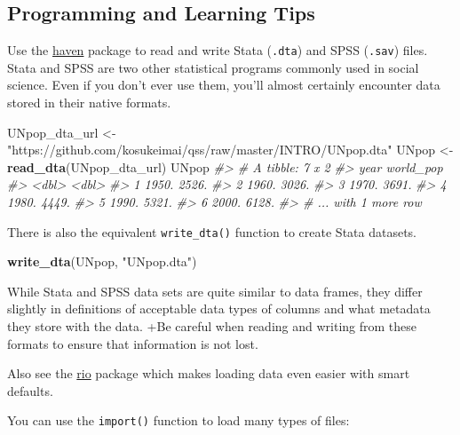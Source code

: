 \documentclass[]{book}
\newenvironment{Shaded}{\begin{snugshade}}{\end{snugshade}}
\newcommand{\CommentTok}[1]{\textcolor[rgb]{0.56,0.35,0.01}{\textit{#1}}}
\newcommand{\KeywordTok}[1]{\textcolor[rgb]{0.13,0.29,0.53}{\textbf{#1}}}
\newcommand{\NormalTok}[1]{#1}
\newcommand{\StringTok}[1]{\textcolor[rgb]{0.31,0.60,0.02}{#1}}
\theoremstyle{definition}
\theoremstyle{definition}
\theoremstyle{definition}
\theoremstyle{remark}
\begin{document}
\hypertarget{programming-and-learning-tips}{%
\subsection{Programming and Learning
Tips}\label{programming-and-learning-tips}}

Use the \href{http://haven.tidyverse.org/}{haven} package to read and
write Stata (\texttt{.dta}) and SPSS (\texttt{.sav}) files. Stata and
SPSS are two other statistical programs commonly used in social science.
Even if you don't ever use them, you'll almost certainly encounter data
stored in their native formats.

\begin{Shaded}
\begin{Highlighting}[]
\NormalTok{UNpop_dta_url <-}\StringTok{ "https://github.com/kosukeimai/qss/raw/master/INTRO/UNpop.dta"}
\NormalTok{UNpop <-}\StringTok{ }\KeywordTok{read_dta}\NormalTok{(UNpop_dta_url)}
\NormalTok{UNpop}
\CommentTok{#> # A tibble: 7 x 2}
\CommentTok{#>    year world_pop}
\CommentTok{#>   <dbl>     <dbl>}
\CommentTok{#> 1 1950.     2526.}
\CommentTok{#> 2 1960.     3026.}
\CommentTok{#> 3 1970.     3691.}
\CommentTok{#> 4 1980.     4449.}
\CommentTok{#> 5 1990.     5321.}
\CommentTok{#> 6 2000.     6128.}
\CommentTok{#> # ... with 1 more row}
\end{Highlighting}
\end{Shaded}

There is also the equivalent \texttt{write\_dta()} function to create
Stata datasets.

\begin{Shaded}
\begin{Highlighting}[]
\KeywordTok{write_dta}\NormalTok{(UNpop, }\StringTok{"UNpop.dta"}\NormalTok{)}
\end{Highlighting}
\end{Shaded}

While Stata and SPSS data sets are quite similar to data frames, they
differ slightly in definitions of acceptable data types of columns and
what metadata they store with the data. +Be careful when reading and
writing from these formats to ensure that information is not lost.

Also see the \href{https://cran.r-project.org/package=rio}{rio} package
which makes loading data even easier with smart defaults.

You can use the \texttt{import()} function to load many types of files:
\end{document}
